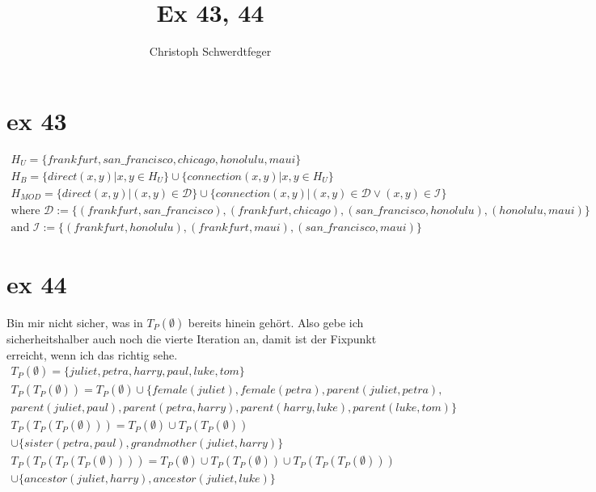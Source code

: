 \documentclass[10pt]{article}
\title{Ex 43, 44}
\author{Christoph Schwerdtfeger}
\begin{document}
\maketitle
\section{ex 43}
\begin{align*}
H_U=\{ frankfurt, san\_francisco, chicago, honolulu, maui \}
\\ H_B=\{direct(x,y)|x,y\in H_U\} \cup \{connection(x,y)|x,y\in H_U\}
\\H_{MOD}=\{direct(x,y)| (x,y)\in \mathcal D \}\cup \{ connection(x,y)|(x,y) \in \mathcal D \vee (x,y) \in \mathcal I\}
\\\text{where } \mathcal D := \{(frankfurt,san\_francisco), (frankfurt, chicago), (san\_francisco, honolulu), (honolulu, maui)\}
\\\text{and } \mathcal I := \{(frankfurt, honolulu),(frankfurt, maui), (san\_francisco, maui)\}
\end{align*}
\section{ex 44}
Bin mir nicht sicher, was in $T_P(\emptyset)$ bereits hinein gehört. Also gebe ich sicherheitshalber auch noch die vierte Iteration an, damit ist der Fixpunkt erreicht, wenn ich das richtig sehe.
\begin{align*}
T_P(\emptyset)=\{juliet, petra, harry, paul, luke, tom\}
\\T_P(T_P(\emptyset))= T_P(\emptyset)\cup \{female( juliet ), female(petra ), parent(juliet , petra), \\parent( juliet , paul ), parent(petra , harry ), parent(harry, luke), parent ( luke , tom )
\}
\\T_P(T_P(T_P(\emptyset)))= T_P(\emptyset)\cup T_P(T_P(\emptyset))
\\ \cup \{ sister(petra, paul), grandmother(juliet, harry)    \}
\\T_P(T_P(T_P(T_P(\emptyset))))= T_P(\emptyset)\cup T_P(T_P(\emptyset))\cup T_P(T_P(T_P(\emptyset)))
\\\cup \{ancestor(juliet, harry), ancestor(juliet, luke)\}
\end{align*}
\end{document}
